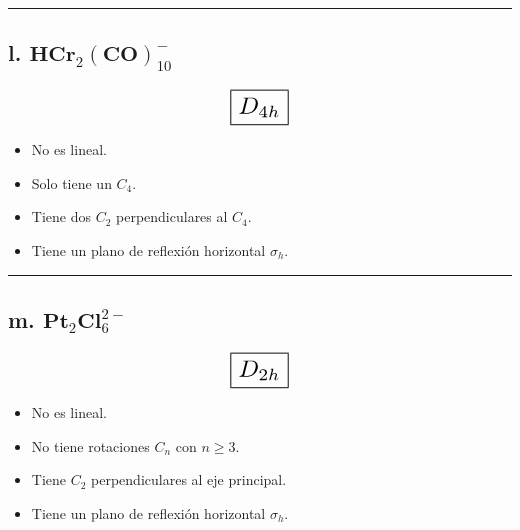 \iffalse
No es lineal.
No tiene mas de dos rotaciones $C_n$ con $n \geq 3$.
No tiene $C_2$ perpendiculares al eje principal.
No tiene plano de reflexión horizontal.
Tiene cuatro planos verticales de reflexión.

C_4v
\fi

\begin{center}
    \rule{15cm}{0.4pt}
\end{center}


\subsection*{l. $\textbf{HCr}_2\left(\textbf{CO}\right)^{-}_{10}$}

\[ \scalebox{1.7}{$\boxed{D_{4h}}$} \]

\begin{itemize}
    \item No es lineal.
    \item Solo tiene un $C_4$.
    \item Tiene dos $C_2$ perpendiculares al $C_4$.
    \item Tiene un plano de reflexión horizontal $\sigma_h$.
\end{itemize}

\iffalse
No es lineal.
Solo tiene un $C_4$.
Tiene dos $C_2$ perpendiculares al $C_4$.
Tiene un plano de reflexión horizontal $\sigma_h$.

D_4h
\fi

\begin{center}
    \rule{15cm}{0.4pt}
\end{center}


\subsection*{m. $\textbf{Pt}_2\textbf{Cl}^{2-}_{6}$}

\[ \scalebox{1.7}{$\boxed{D_{2h}}$} \]

\begin{itemize}
    \item No es lineal.
    \item No tiene rotaciones $C_n$ con $n \geq 3$.
    \item Tiene $C_2$ perpendiculares al eje principal.
    \item Tiene un plano de reflexión horizontal $\sigma_h$.
\end{itemize}

